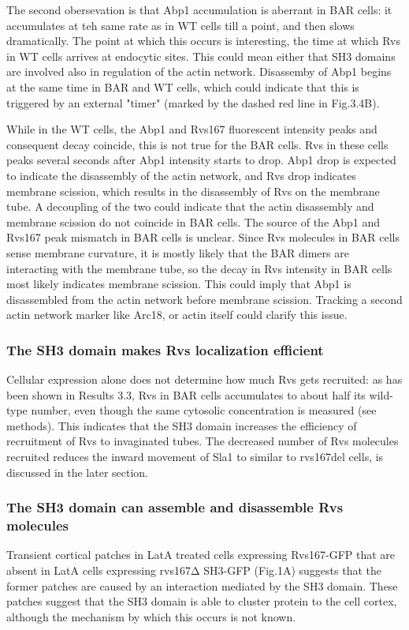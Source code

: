 The second obersevation is that Abp1 accumulation is aberrant in BAR cells: it accumulates at teh same rate as in WT cells till a point, and then slows dramatically. 
The point at which this occurs is interesting, the time at which Rvs in WT cells arrives at endocytic sites. This could mean either that SH3 domains are involved also in regulation of the actin network. Disassemby of Abp1 begins at the same time in BAR and WT cells, which could indicate that this is triggered by an external "timer" (marked by the dashed red line in Fig.3.4B). 

While in the WT cells, the Abp1 and Rvs167 fluorescent intensity peaks and consequent decay coincide, this is not true for the BAR cells. Rvs in these cells peaks several seconds after Abp1 intensity starts to drop. Abp1 drop is expected to indicate the disassembly of the actin network, and Rvs drop indicates membrane scission, which results in the disassembly of Rvs on the membrane tube. A decoupling of the two could indicate that the actin disassembly and membrane scission do not coincide in BAR cells. The source of the Abp1 and Rvs167 peak mismatch in BAR cells is unclear. Since Rvs molecules in BAR cells sense membrane curvature, it is mostly likely that the BAR dimers are interacting with the membrane tube, so the decay in Rvs intensity in BAR cells most likely indicates membrane scission. This could imply that Abp1 is disassembled from the actin network before membrane scission. Tracking a second actin network marker like Arc18, or actin itself could clarify this issue.  


\subsubsection{The SH3 domain makes Rvs localization efficient}
Cellular expression alone does not determine how much Rvs gets recruited: as has been shown in Results 3.3, Rvs in BAR cells accumulates to about half its wild-type number, even though the same cytosolic concentration is measured (see methods). This indicates that the SH3 domain increases the efficiency of recruitment of Rvs to invaginated tubes. The decreased number of Rvs molecules recruited reduces the inward movement of Sla1 to similar to rvs167del cells, is discussed in the later section.

\subsubsection{The SH3 domain can assemble and disassemble Rvs molecules}
Transient cortical patches in LatA treated cells expressing Rvs167-GFP that are absent in LatA cells expressing rvs167Δ SH3-GFP (Fig.1A) suggests that the former patches are caused by an interaction mediated by the SH3 domain. These patches suggest that the SH3 domain is able to cluster protein to the cell cortex, although the mechanism by which this occurs is not known. 

